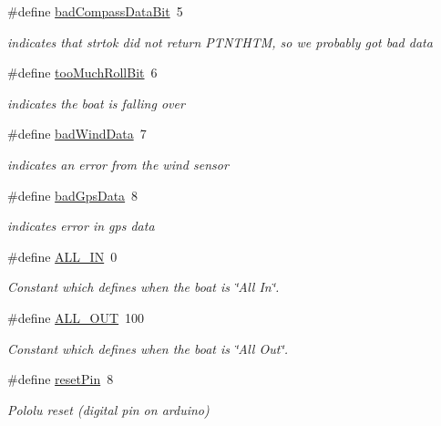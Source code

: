 \begin{DoxyCompactItemize}
\#define \hyperlink{group__globalconstants_ga69c4923d7bb43a1880f9fbb878bed927}{bad\-Compass\-Data\-Bit}~5
\begin{DoxyCompactList}\small\item\em indicates that strtok did not return \-P\-T\-N\-T\-H\-T\-M, so we probably got bad data \end{DoxyCompactList}\item 
\#define \hyperlink{group__globalconstants_ga808c40e80d82d52b2ceab81282ad35ec}{too\-Much\-Roll\-Bit}~6
\begin{DoxyCompactList}\small\item\em indicates the boat is falling over \end{DoxyCompactList}\item 
\#define \hyperlink{group__globalconstants_ga55cee1ec4df41dd9b7b71c6aa9619bfc}{bad\-Wind\-Data}~7
\begin{DoxyCompactList}\small\item\em indicates an error from the wind sensor \end{DoxyCompactList}\item 
\#define \hyperlink{group__globalconstants_ga5219c41d9ae91432ffb55ec7aeef8873}{bad\-Gps\-Data}~8
\begin{DoxyCompactList}\small\item\em indicates error in gps data \end{DoxyCompactList}\item 
\#define \hyperlink{group__globalconstants_gaaadbf956e6981264e6bf369a08269821}{\-A\-L\-L\-\_\-\-I\-N}~0
\begin{DoxyCompactList}\small\item\em \-Constant which defines when the boat is \char`\"{}\-All In\char`\"{}. \end{DoxyCompactList}\item 
\#define \hyperlink{group__globalconstants_ga074485974be5a03e711020873d83fd90}{\-A\-L\-L\-\_\-\-O\-U\-T}~100
\begin{DoxyCompactList}\small\item\em \-Constant which defines when the boat is \char`\"{}\-All Out\char`\"{}. \end{DoxyCompactList}\item 
\#define \hyperlink{group__globalconstants_gad67ff299260393832da3b34efaaee56a}{reset\-Pin}~8
\begin{DoxyCompactList}\small\item\em \-Pololu reset (digital pin on arduino) \end{DoxyCompactList}\item 

\end{DoxyCompactItemize}
